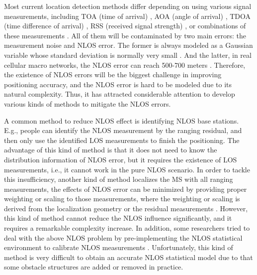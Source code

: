 \documentclass[journal]{IEEEtran}
\begin{document}

Most current location detection methods differ depending on using various signal measurements, including TOA (time of arrival) \cite{re12,re13}, AOA (angle of arrival) \cite{re14}, TDOA (time difference of arrival) \cite{re15}, RSS (received signal strength) \cite{re16,re17}, or combinations of these measurements \cite{re18,re19}. All of them will be contaminated by two main errors: the measurement noise and NLOS error. The former is always modeled as a Gaussian variable whose standard deviation is normally very small \cite{re20}. And the latter, in real cellular macro networks, the NLOS error can reach 500-700 meters \cite{re21}. Therefore, the existence of NLOS errors will be the biggest challenge in improving positioning accuracy, and the NLOS error is hard to be modeled due to its natural complexity. Thus, it has attracted considerable attention to develop various kinds of methods to mitigate the NLOS errors.

A common method to reduce NLOS effect is identifying NLOS base stations. E.g., people can identify the NLOS measurement by the ranging residual\cite{re22,re23}, and then only use the identified LOS measurements to finish the positioning. The advantage of this kind of method is that it does not need to know the distribution information of NLOS error, but it requires the existence of LOS measurements, i.e., it cannot work in the pure NLOS scenario. In order to tackle this insufficiency, another kind of method localizes the MS with all ranging measurements, the effects of NLOS error can be minimized by providing proper weighting or scaling to those measurements, where the weighting or scaling is derived from the localization geometry or the residual measurements \cite{re24,re25,re26}. However, this kind of method cannot reduce the NLOS influence significantly, and it requires a remarkable complexity increase. In addition, some researchers tried to deal with the above NLOS problem by pre-implementing the NLOS statistical environment to calibrate NLOS measurements \cite{re27,re28}. Unfortunately, this kind of method is very difficult to obtain an accurate NLOS statistical model due to that some obstacle structures are added or removed in practice.
\end{document}
